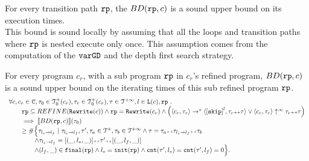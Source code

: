 For every transition path $\mathtt{rp}$, the $BD(\mathtt{rp}, c)$
is a sound upper bound on its execution times.
\\
This bound is sound locally by assuming
that all the loops and transition paths where $\mathtt{rp}$ is nested execute only once.
This assumption comes from the computation of the $\mathtt{varGD}$ and the depth first search strategy.
\\
%
\begin{lemma}
    For every program $c_r$, with a sub program $\mathtt{rp}$ in $c_r$'s refined program,
    $BD(\mathtt{rp}, c)$ is a sound upper bound on the iterating times of this sub refined program $\mathtt{rp}$.
    \[
      \begin{array}{l}
      \forall c, c_r \in \cdom, \trace_0 \in \ftdom_0(c_r), \trace_r \in \ftdom_0(c_r), \trace \in \tdom, l \in \lvar(c), \rprog \st 
      \\ \qquad
      \rprog \subseteq REFINE(\algrewrite(c))
      \land 
      \rprog = \algrewrite(c_r)
      \land 
      \Big(
        \config{c_r, \trace_r} \rightarrow^* \config{\clabel{\eskip}^{l}, \trace_r \tracecat \trace}
        \lor \config{c_r, \trace_r} \uparrow^{\infty} \trace_r \tracecat \trace 
        \Big)
      \\ \qquad
      \implies
      \econfig{BD(\rprog, c)}(\trace_0) 
      \\ \qquad \geq 
      \# \Big\{\trace_{l_s \to l_f} ~\vert~ \trace_{l_s \to l_f}, \trace', \trace_a \in \ftdom, \trace_b \in \tdom
      \land \trace = \trace_a \tracecat \trace_{l_s \to l_f} \tracecat \trace_b
      \\ \qquad \qquad
      \land \trace_{l_s \to l_f} = [(\_, l_s, \_)] \tracecat \trace' \tracecat [(\_, l_f, \_)]
      \\ \qquad \qquad
      \land (l_{f}, \_) \in \absfinal(\rprog)
      \land l_s = \absinit(\rprog)
      \land \counter(\trace', l_s) = \counter(\trace', l_f) = 0 
      \Big\}.
      \end{array}
    \]
    \end{lemma}

